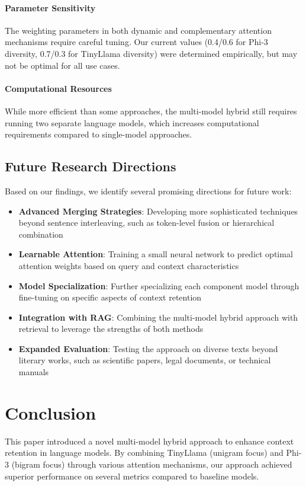 \documentclass[conference]{IEEEtran}
\begin{document}
\paragraph{Parameter Sensitivity}
The weighting parameters in both dynamic and complementary attention mechanisms require careful tuning. Our current values (0.4/0.6 for Phi-3 diversity, 0.7/0.3 for TinyLlama diversity) were determined empirically, but may not be optimal for all use cases.

\paragraph{Computational Resources}
While more efficient than some approaches, the multi-model hybrid still requires running two separate language models, which increases computational requirements compared to single-model approaches.

\subsection{Future Research Directions}
Based on our findings, we identify several promising directions for future work:

\begin{itemize}
    \item \textbf{Advanced Merging Strategies}: Developing more sophisticated techniques beyond sentence interleaving, such as token-level fusion or hierarchical combination
    \item \textbf{Learnable Attention}: Training a small neural network to predict optimal attention weights based on query and context characteristics
    \item \textbf{Model Specialization}: Further specializing each component model through fine-tuning on specific aspects of context retention
    \item \textbf{Integration with RAG}: Combining the multi-model hybrid approach with retrieval to leverage the strengths of both methods
    \item \textbf{Expanded Evaluation}: Testing the approach on diverse texts beyond literary works, such as scientific papers, legal documents, or technical manuals
\end{itemize}

\section{Conclusion}
This paper introduced a novel multi-model hybrid approach to enhance context retention in language models. By combining TinyLlama (unigram focus) and Phi-3 (bigram focus) through various attention mechanisms, our approach achieved superior performance on several metrics compared to baseline models.
\end{document}
